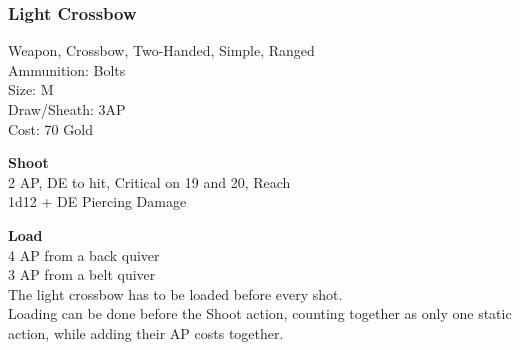 \subsubsection{Light Crossbow}\label{weapon:lightCrossbow}
Weapon, Crossbow, Two-Handed, Simple, Ranged\\
Ammunition: Bolts\\
Size: M\\
Draw/Sheath: 3AP\\
Cost: 70 Gold

\textbf{Shoot} \\
2 AP, DE to hit, Critical on 19 and 20,  Reach\\
1d12 + \texttimes DE Piercing Damage

\textbf{Load} \\
4 AP from a back quiver\\
3 AP from a belt quiver\\
The light crossbow has to be loaded before every shot.\\
Loading can be done before the Shoot action, counting together as only one static action, while adding their AP costs together.\\